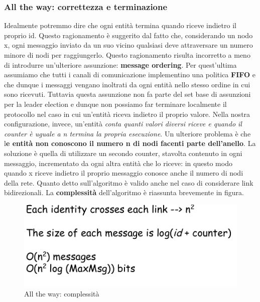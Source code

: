 \documentclass[12pt]{article}
\begin{document}
		\subsubsection{All the way: correttezza e terminazione}
			Idealmente potremmo dire che ogni entità termina quando riceve indietro il proprio id. Questo ragionamento è suggerito dal fatto che, considerando un nodo x, ogni messaggio inviato da un suo vicino qualsiasi deve attraversare un numero minore di nodi per raggiungerlo. Questo ragionamento risulta incorretto a meno di introdurre un'ulteriore assunzione: \textbf{message ordering}. Per quest'ultima assumiamo che tutti i canali di comunicazione implementino una politica \textbf{FIFO} e che dunque i messaggi vengano inoltrati da ogni entità nello stesso ordine in cui sono ricevuti. Tuttavia questa assunzione non fa parte del set base di assunzioni per la leader election e dunque non possiamo far terminare localmente il protocollo nel caso in cui un'entità riceva indietro il proprio valore.  Nella nostra configurazione, invece, un'entità \textit{conta quanti valori diversi riceve e quando il counter è uguale a n termina la propria esecuzione}. Un ulteriore problema è che l\textbf{e entità non conoscono il numero n di nodi facenti parte dell'anello}. La soluzione è quella di utilizzare un secondo counter, stavolta contenuto in ogni messaggio, incrementato da ogni altra entità che lo riceve: in questo modo quando x riceve indietro il proprio messaggio conosce anche il numero di nodi della rete. Quanto detto sull'algoritmo è valido anche nel caso di considerare link bidirezionali.
			La \textbf{complessità} dell'algoritmo è riassunta brevemente in figura.  
			\begin{figure}[h!]
				\centering
				\includegraphics[scale=0.30]{img/allcomp.png}
				\caption{All the way: complessità}
			\end{figure}
		
\end{document}
